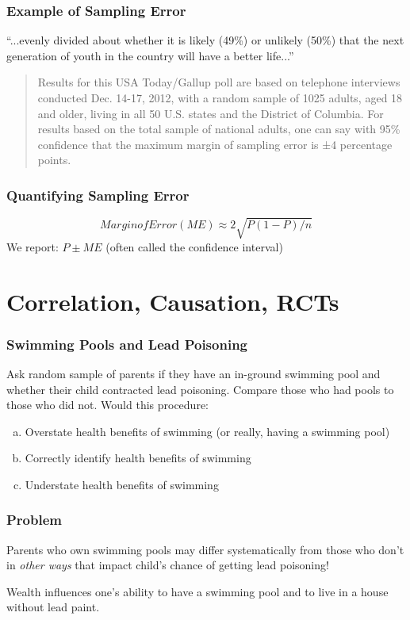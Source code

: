 \documentclass{beamer}
\begin{document}
\begin{frame}
\frametitle{Example of Sampling Error}
	``...evenly divided about whether it is likely (49\%) or unlikely (50\%) that the next generation 		of youth in the country will have a better life...''
	\vspace{2em}
	\begin{quote}
		Results for this USA Today/Gallup poll are based on telephone interviews conducted Dec. 			14-17, 2012, with a \alert{random sample of 1025 adults}, aged 18 and older, living in all 50 			U.S. states and the District of Columbia. For results based on the total sample of national 			adults, one can say with \alert{95\% confidence that the maximum margin of sampling 				error is ±4 percentage points}.
	\end{quote}
\end{frame}

\begin{frame}
\frametitle{Quantifying Sampling Error}
	$$Margin of Error (ME) \approx 2 \sqrt{P(1-P)/n}$$
	We report: $P \pm ME$ (often called the confidence interval)
\end{frame}

\section{Correlation, Causation, RCTs}
\begin{frame}
\frametitle{Swimming Pools and Lead Poisoning}
	Ask random sample of parents if they have an in-ground swimming pool and whether their   			child contracted lead poisoning. Compare those who had pools to those who did not.
	\vspace{1em}
	Would this procedure:
		\begin{enumerate}[(a)]
			\item Overstate health benefits of swimming (or really, having a swimming pool)
			\item Correctly identify health benefits of swimming
			\item Understate health benefits of swimming
		\end{enumerate}
\end{frame}

\begin{frame}
\frametitle{Problem}
	Parents who own swimming pools may differ systematically from those who don't in 				\emph{other ways} that impact child's chance of getting lead poisoning!
	\vspace{2em}
	\begin{alertblock}{Wealth influences one's ability to have a swimming pool and to live in a house without lead paint.}
	\end{alertblock}
\end{frame}
\end{document}

